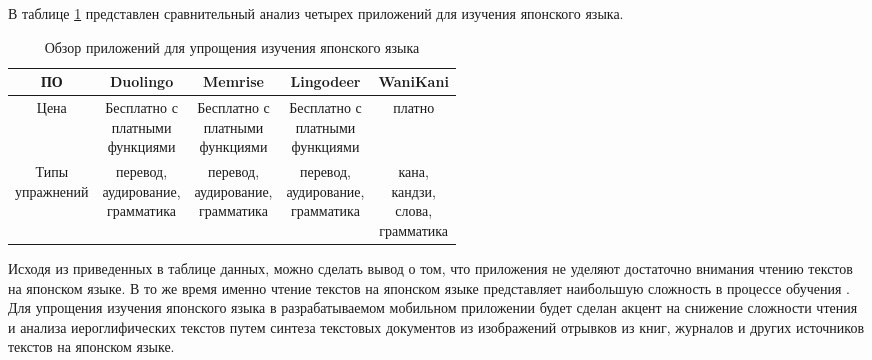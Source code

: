 \clearpage

В таблице \ref{tab:jap-apps} представлен сравнительный анализ
четырех приложений для изучения японского языка.

\begin{table}[ht]
  \caption{Обзор приложений для упрощения изучения японского языка}
  \label{tab:jap-apps}
  \begin{center}
    \begin{tabular}{|c|c|c|c|c|}
      \hline
      ПО & Duolingo \cite{duolingo} & Memrise \cite{memrise} & Lingodeer \cite{lingodeer} & WaniKani \cite{wanikani} \\
      \hline
      Цена & \makecell{Бесплатно с \\ платными \\ функциями} & \makecell{Бесплатно с\\ платными \\ функциями} & \makecell{Бесплатно с \\ платными \\ функциями} & платно \\
      \hline
      \makecell{Типы \\ упражнений} & \makecell{перевод, \\ аудирование, \\ грамматика} & \makecell{перевод, \\ аудирование, \\ грамматика} & \makecell{перевод, \\ аудирование, \\ грамматика} & \makecell{кана, \\ кандзи, \\ слова, \\ грамматика} \\
      \hline
    \end{tabular}
  \end{center}
\end{table}

Исходя из приведенных в таблице данных, можно сделать вывод о том,
что приложения не уделяют достаточно внимания чтению текстов
на японском языке. В то же время именно чтение текстов на японском
языке представляет наибольшую сложность в процессе обучения \cite{diff-kanji}.
Для упрощения изучения японского языка в разрабатываемом мобильном
приложении будет сделан акцент на снижение сложности чтения и анализа
иероглифических текстов путем синтеза текстовых документов из
изображений отрывков из книг, журналов и других источников текстов
на японском языке.

